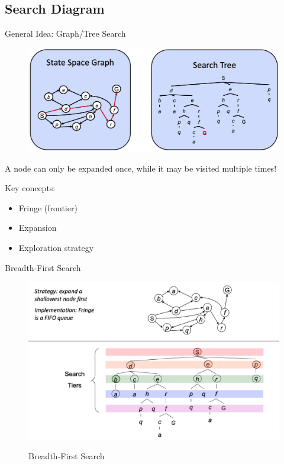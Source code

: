 \documentclass{beamer}
\begin{document}
\subsection{Search Diagram}

\begin{frame}{General Idea: Graph/Tree Search}
    \begin{figure}[htpb]
        \centering
        \includegraphics[width=0.8\linewidth]{pic/tree_search.png}
    \end{figure}
    \alert{A node can only be expanded once, while it may be visited multiple times!}
    
    \begin{exampleblock}{Key concepts:}
        \begin{itemize}
            \item Fringe (frontier)

            \item Expansion

            \item Exploration strategy
        \end{itemize}
    \end{exampleblock}
    
\end{frame}

\begin{frame}{Breadth-First Search}
    \begin{figure}[htpb]
        \centering
        \includegraphics[width=1\linewidth]{pic/bfs-u.png}
        \pause
        \includegraphics[width=1\linewidth]{pic/bfs-d.png}

        \caption{Breadth-First Search}
    \end{figure}
\end{frame}
\end{document}
